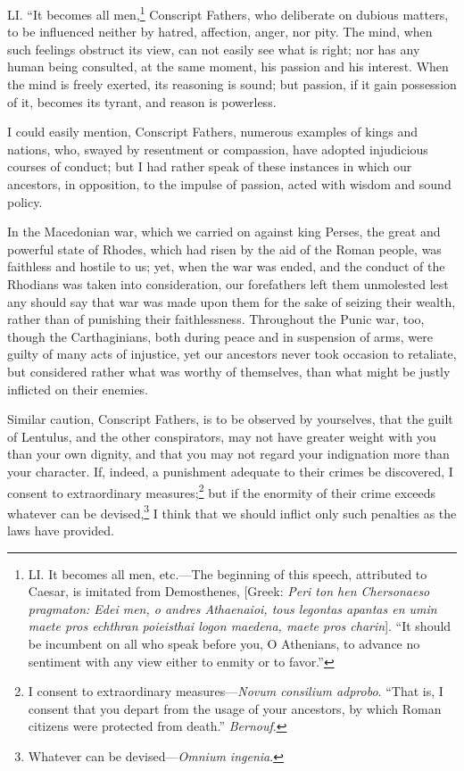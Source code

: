 LI. ``It becomes all men,\footnote{LI. It becomes all men, etc.—The beginning of this speech,
attributed to Caesar, is imitated from Demosthenes, [Greek: \emph{Peri ton
hen Chersonaeso pragmaton: Edei men, o andres Athaenaioi, tous
legontas apantas en umin maete pros echthran poieisthai logon maedena,
maete pros charin}]. ``It should be incumbent on all who speak before
you, O Athenians, to advance no sentiment with any view either to
enmity or to favor.''} Conscript Fathers, who deliberate on
dubious matters, to be influenced neither by hatred, affection, anger,
nor pity. The mind, when such feelings obstruct its view, can not
easily see what is right; nor has any human being consulted, at the
same moment, his passion and his interest. When the mind is freely
exerted, its reasoning is sound; but passion, if it gain possession of
it, becomes its tyrant, and reason is powerless.

I could easily mention, Conscript Fathers, numerous examples of kings
and nations, who, swayed by resentment or compassion, have adopted
injudicious courses of conduct; but I had rather speak of these
instances in which our ancestors, in opposition, to the impulse of
passion, acted with wisdom and sound policy.

In the Macedonian war, which we carried on against king Perses, the
great and powerful state of Rhodes, which had risen by the aid of the
Roman people, was faithless and hostile to us; yet, when the war was
ended, and the conduct of the Rhodians was taken into consideration,
our forefathers left them unmolested lest any should say that war was
made upon them for the sake of seizing their wealth, rather than of
punishing their faithlessness. Throughout the Punic war, too, though
the Carthaginians, both during peace and in suspension of arms, were
guilty of many acts of injustice, yet our ancestors never took
occasion to retaliate, but considered rather what was worthy of
themselves, than what might be justly inflicted on their enemies.

Similar caution, Conscript Fathers, is to be observed by yourselves,
that the guilt of Lentulus, and the other conspirators, may not have
greater weight with you than your own dignity, and that you may not
regard your indignation more than your character. If, indeed, a
punishment adequate to their crimes be discovered, I consent to
extraordinary measures;\footnote{I consent to extraordinary measures—\emph{Novum consilium adprobo}.
``That is, I consent that you depart from the usage of your ancestors,
by which Roman citizens were protected from death.'' \emph{Bernouf}.} but if the enormity of their crime
exceeds whatever can be devised,\footnote{Whatever can be devised—\emph{Omnium ingenia}.} I think that we should inflict
only such penalties as the laws have provided.

